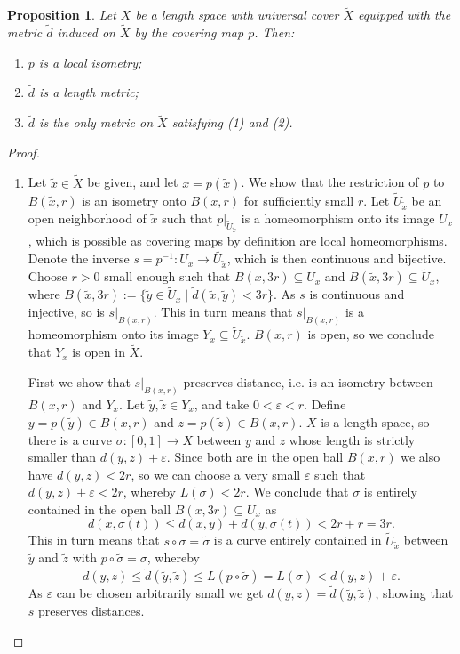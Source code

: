 \documentclass[11pt, a4paper, oneside]{memoir}
\theoremstyle{plain}\newtheorem{theorem}[subsection]{Theorem}
\newtheorem{proposition}[subsection]{Proposition}
\theoremstyle{definition}
\newcommand{\parenum}{\setenumerate[1]{label=\textbf{(\arabic*)}}}
\newcommand{\twiddle}[1]{\widetilde{#1}}
\begin{document}
\begin{proposition}\label{prop:p_loc_iso}
Let \(X\) be a length space with universal cover \(\twiddle{X}\) equipped with the metric \(\twiddle{d}\) induced on \(\twiddle{X}\) by the covering map \(p\).
Then:\parenum
\begin{enumerate}
    \item \(p\) is a local isometry;
    \item \(\twiddle{d}\) is a length metric;
    \item \(\twiddle{d}\) is the only metric on \(\twiddle{X}\) satisfying (1) and (2).
\end{enumerate}
\end{proposition}
\begin{proof}
\parenum\begin{enumerate}
    \item Let \(\twiddle{x}\in\twiddle{X}\) be given, and let \(x=p(\twiddle{x})\).
We show that the restriction of \(p\) to \(B(\twiddle{x},r)\) is an isometry onto \(B(x,r)\) for sufficiently small \(r\).
Let \(\twiddle{U}_{\twiddle{x}}\) be an open neighborhood of \(\twiddle{x}\) such that \(p|_{\twiddle{U}_{\twiddle{x}}}\) is a homeomorphism onto its image \(U_x\), which is possible as covering maps by definition are local homeomorphisms.
Denote the inverse \(s=p^{-1}:U_x\to\twiddle{U_{\twiddle{x}}}\), which is then continuous and bijective.
Choose \(r>0\) small enough such that \(B(x,3r)\subseteq U_x\) and \(B(\twiddle{x},3r)\subseteq\twiddle{U}_{x}\), where $B(\twiddle{x},3r):= \{ \twiddle{y} \in \twiddle{U}_{x}  \; \vert \; \twiddle{d}(\twiddle{x},\twiddle{y}) < 3r\}$.
As \(s\) is continuous and injective, so is \(s|_{B(x,r)}\).
This in turn means that \(s|_{B(x,r)}\) is a homeomorphism onto its image \(Y_x\subseteq\twiddle{U}_{\twiddle{x}}\).
\(B(x,r)\) is open, so we conclude that \(Y_x\) is open in \(\twiddle{X}\).

First we show that \(s|_{B(x,r)}\) preserves distance, i.e. is an isometry between \(B(x,r)\) and \(Y_x\).
Let \(\twiddle{y},\twiddle{z}\in Y_x\), and take \(0<\varepsilon<r\).
Define \(y=p(\twiddle{y})\in B(x,r)\) and \(z=p(\twiddle{z})\in B(x,r)\).
\(X\) is a length space, so there is a curve \(\sigma:[0,1]\to X\) between \(y\) and \(z\) whose length is strictly smaller than \(d(y,z)+\varepsilon\).
Since both are in the open ball \(B(x,r)\) we also have \(d(y,z)<2r\), so we can choose a very small \(\varepsilon\) such that \(d(y,z)+\varepsilon<2r\), whereby \(L(\sigma)<2r\).
We conclude that \(\sigma\) is entirely contained in the open ball \(B(x,3r)\subseteq U_x\) as
\[d(x,\sigma(t))\leq d(x,y)+d(y,\sigma(t))<2r+r=3r.\]
This in turn means that \(s\circ\sigma=\twiddle{\sigma}\) is a curve entirely contained in \(\twiddle{U}_{\twiddle{x}}\) between \(\twiddle{y}\) and \(\twiddle{z}\) with \(p\circ\twiddle{\sigma}=\sigma\), whereby 
\[d(y,z)\leq \twiddle{d}(\twiddle{y},\twiddle{z})\leq L(p\circ\twiddle{\sigma})=L(\sigma)<d(y,z)+\varepsilon.\]
As \(\varepsilon\) can be chosen arbitrarily small we get \(d(y,z)=\twiddle{d}(\twiddle{y},\twiddle{z})\), showing that \(s\) preserves distances.


\end{enumerate}
\end{proof}
\end{document}

